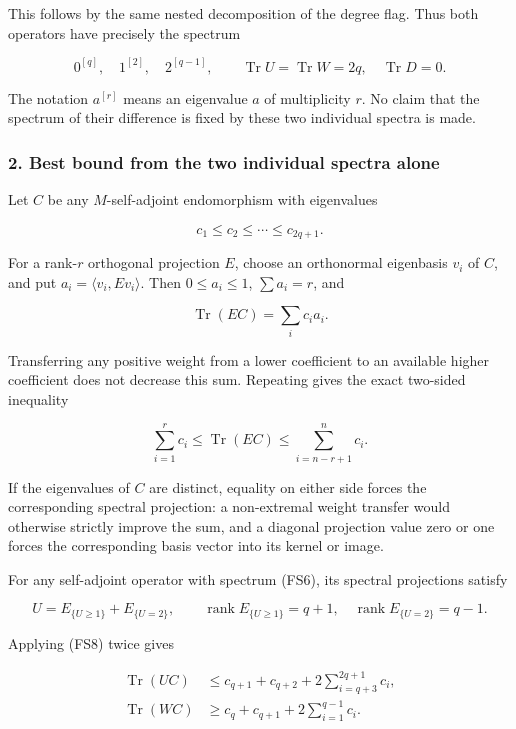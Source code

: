 This follows by the same nested decomposition of the degree flag. Thus both operators have precisely the spectrum

\[
0^{[q]},\quad1^{[2]},\quad2^{[q-1]},
\qquad \operatorname{Tr}U=\operatorname{Tr}W=2q,
\quad \operatorname{Tr}D=0.
\tag{FS6}
\]

The notation \(a^{[r]}\) means an eigenvalue \(a\) of multiplicity \(r\). No claim that the spectrum of their difference is fixed by these two individual spectra is made.

\subsubsection{2. Best bound from the two individual spectra alone}\label{endpoint-four_window_sharpness--best-bound-from-the-two-individual-spectra-alone}

Let \(C\) be any \(M\)-self-adjoint endomorphism with eigenvalues

\[
c_1\le c_2\le\cdots\le c_{2q+1}.
\tag{FS7}
\]

For a rank-\(r\) orthogonal projection \(E\), choose an orthonormal eigenbasis \(v_i\) of \(C\), and put \(a_i=\langle v_i,Ev_i\rangle\). Then \(0\le a_i\le1\), \(\sum a_i=r\), and

\[
\operatorname{Tr}(EC)=\sum_i c_i a_i.
\]

Transferring any positive weight from a lower coefficient to an available higher coefficient does not decrease this sum. Repeating gives the exact two-sided inequality

\[
\sum_{i=1}^r c_i\le\operatorname{Tr}(EC)
\le\sum_{i=n-r+1}^n c_i.
\tag{FS8}
\]

If the eigenvalues of \(C\) are distinct, equality on either side forces the corresponding spectral projection: a non-extremal weight transfer would otherwise strictly improve the sum, and a diagonal projection value zero or one forces the corresponding basis vector into its kernel or image.

For any self-adjoint operator with spectrum (FS6), its spectral projections satisfy

\[
U=E_{\{U\ge1\}}+E_{\{U=2\}},
\qquad \operatorname{rank}E_{\{U\ge1\}}=q+1,
\quad\operatorname{rank}E_{\{U=2\}}=q-1.
\tag{FS9}
\]

Applying (FS8) twice gives

\[
\begin{aligned}
\operatorname{Tr}(UC)
&\le c_{q+1}+c_{q+2}+2\sum_{i=q+3}^{2q+1}c_i,\\
\operatorname{Tr}(WC)
&\ge c_q+c_{q+1}+2\sum_{i=1}^{q-1}c_i.
\end{aligned}
\tag{FS10}
\]

